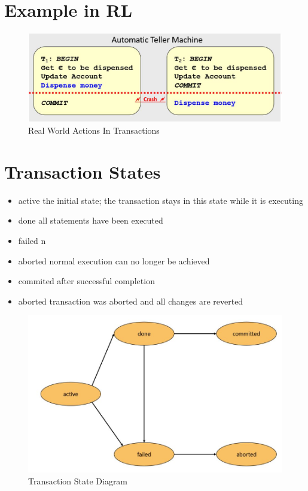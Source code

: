 	\section{Example in RL}
		\begin{figure}[h!]
			\includegraphics[scale=0.5]{res/real-life-transaction.jpg}
			\caption{Real World Actions In Transactions}
		\end{figure}
	
	\section{Transaction States}
		\begin{itemize}
			\item active
				\subitem  the initial state; the transaction stays in this state while it is executing 
			\item done
				\subitem all statements have been executed
			\item failed 
				\subitem n
			\item aborted normal execution can no longer be achieved
			\item commited
				\subitem after successful completion
			\item aborted
				\subitem transaction was aborted and all changes are reverted
		\end{itemize}
			
		\begin{figure}[h!]
			\includegraphics[scale=0.5]{res/state-diagram-transaction.jpg}
			\caption{Transaction State Diagram}
		\end{figure}
	
